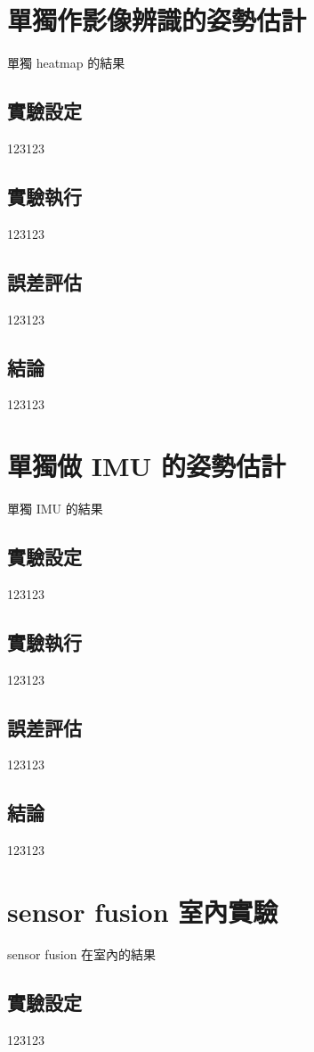 \section{單獨作影像辨識的姿勢估計}
單獨 heatmap 的結果
\subsection{實驗設定}
123123
\subsection{實驗執行}
123123
\subsection{誤差評估}
123123
\subsection{結論}
123123

\section{單獨做 IMU 的姿勢估計}
單獨 IMU 的結果
\subsection{實驗設定}
123123
\subsection{實驗執行}
123123
\subsection{誤差評估}
123123
\subsection{結論}
123123

\section{sensor fusion 室內實驗}
sensor fusion 在室內的結果
\subsection{實驗設定}
123123

